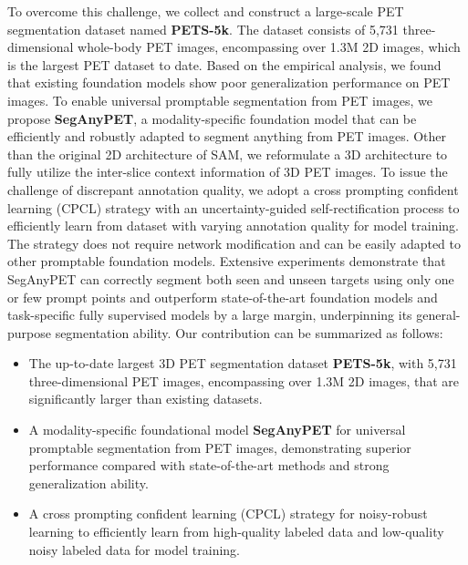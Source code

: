 To overcome this challenge, we collect and construct a large-scale PET segmentation dataset named \textbf{PETS-5k}. The dataset consists of 5,731 three-dimensional whole-body PET images, encompassing over 1.3M 2D images, which is the largest PET dataset to date. Based on the empirical analysis, we found that existing foundation models show poor generalization performance on PET images.
To enable universal promptable segmentation from PET images, we propose \textbf{SegAnyPET}, a modality-specific foundation model that can be efficiently and robustly adapted to segment anything from PET images.
Other than the original 2D architecture of SAM, we reformulate a 3D architecture to fully utilize the inter-slice context information of 3D PET images.
To issue the challenge of discrepant annotation quality, we adopt a cross prompting confident learning (CPCL) strategy with an uncertainty-guided self-rectification process to efficiently learn from dataset with varying annotation quality for model training. The strategy does not require network modification and can be easily adapted to other promptable foundation models.
Extensive experiments demonstrate that SegAnyPET can correctly segment both seen and unseen targets using only one or few prompt points and outperform state-of-the-art foundation models and task-specific fully supervised models by a large margin, underpinning its general-purpose segmentation ability.
Our contribution can be summarized as follows:


\begin{itemize}
\item The up-to-date largest 3D PET segmentation dataset \textbf{PETS-5k}, with 5,731 three-dimensional PET images, encompassing over 1.3M 2D images, that are significantly larger than existing datasets.
\item A modality-specific foundational model \textbf{SegAnyPET} for universal promptable segmentation from PET images, demonstrating superior performance compared with state-of-the-art methods and strong generalization ability.
\item A cross prompting confident learning (CPCL) strategy for noisy-robust learning to efficiently learn from high-quality labeled data and low-quality noisy labeled data for model training.
\end{itemize}